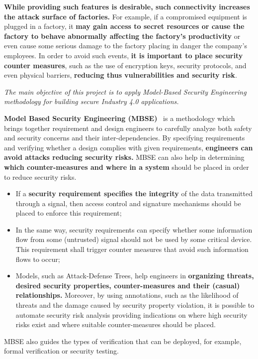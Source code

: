 \textbf{While providing such features is desirable, such connectivity increases the attack surface of factories.} For example, if a compromised equipment is plugged in a factory, it \textbf{may gain access to secret resources or cause the factory to behave abnormally affecting the factory's productivity} or even cause some serious damage to the factory placing in danger the company's employees. In order to avoid such events, \textbf{it is important to place security counter measures}, such as the use of encryption keys, security protocols, and even physical barriers, \textbf{reducing thus vulnerabilities and security risk}. 

\begin{center}
  \emph{The main objective of this project is to apply Model-Based Security Engineering methodology for building secure Industry 4.0 applications.} 
\end{center}

\textbf{Model Based Security Engineering (MBSE)}~\cite{umlsec,secureuml} is a
methodology which brings together requirement and design engineers to carefully
analyze both safety and security concerns and their inter-dependencies. By
specifying requirements and verifying whether a design complies with given
requirements, \textbf{engineers can avoid attacks reducing security risks.} MBSE
can also help in determining \textbf{which counter-measures and where in a
system} should be placed in order to reduce security risks.
\begin{itemize}
  \item If a \textbf{security requirement specifies the integrity} of the data transmitted through a signal, then access control and signature mechanisms should be placed to enforce this requirement;

  \item In the same way, security requirements can specify whether some
  information flow from some (untrusted) signal should not be used by some
  critical device. This requirement shall trigger counter measures that avoid such information flows to occur;

  \item Models, such as Attack-Defense Trees, help engineers in
  \textbf{organizing threats, desired security properties, counter-measures and
  their (casual) relationships.} Moreover, by using annotations, such as the
  likelihood of threats and the damage caused by security property violation, it
  is possible to automate security risk analysis providing indications on where
  high security risks exist and where suitable counter-measures should be
  placed.
\end{itemize}
MBSE also guides the types of verification that can be deployed, for example, formal verification or security testing.

